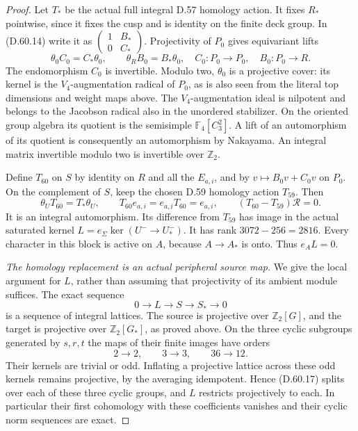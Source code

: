 \begin{proof}
Let \(T_*\) be the actual full
integral D.57 homology action.
It fixes \(R_*\) pointwise,
since it fixes the cusp and is
identity on the finite deck group.
In (D.60.14) write it as
\(\left(\begin{smallmatrix}1&B_*\\0&C_*\end{smallmatrix}\right)\).
Projectivity of \(P_0\) gives
equivariant lifts
\[
 \theta_0 C_0=C_*\theta_0,
 \qquad \theta_R B_0=B_*\theta_0,
 \quad C_0:P_0\to P_0,
 \quad B_0:P_0\to R.
 \tag{D.60.15}
\]
The endomorphism \(C_0\) is
invertible. Modulo two,
\(\theta_0\) is a projective
cover: its kernel is the
\(V_4\)-augmentation radical
of \(P_0\), as is also seen
from the literal top dimensions
and weight maps above. The
\(V_4\)-augmentation ideal
is nilpotent and belongs to
the Jacobson radical also in
the unordered stabilizer.
On the oriented group algebra
its quotient is the semisimple
\(\mathbb F_4[C_3^2]\).
A lift
of an automorphism of its
quotient is consequently an
automorphism by Nakayama.
An integral matrix invertible
modulo two is invertible over
\(\mathbb Z_2\).

Define \(T_{60}\) on \(S\)
by identity on \(R\) and
all the \(E_{a,i}\), and by
\(v\mapsto B_0v+C_0v\)
on \(P_0\). On the complement
of \(S\), keep the chosen
D.59 homology action \(T_{59}\).
Then
\[
 \theta_U T_{60}=T_*\theta_U,
 \qquad T_{60}e_{a,i}=e_{a,i}T_{60}=e_{a,i},
 \qquad
 (T_{60}-T_{59})\mathcal R=0.
 \tag{D.60.16}
\]
It is an integral automorphism.
Its difference from \(T_{59}\)
has image in the actual saturated
kernel \(L=e_\Sigma\ker(U^-\to U_*^-)\).
It has rank \(3072-256=2816\).
Every character in this block
is active on \(A\), because
\(A\to A_*\) is onto.
Thus \(e_A L=0\).

\emph{The homology replacement is an actual peripheral source map.}
We give the local argument for
\(L\), rather than assuming
that projectivity of its ambient
module suffices. The exact
sequence
\[
                 0\longrightarrow L\longrightarrow S
                   \longrightarrow S_*\longrightarrow0
 \tag{D.60.17}
\]
is a sequence of integral lattices.
The source is projective over
\(\mathbb Z_2[G]\), and the
target is projective over
\(\mathbb Z_2[G_*]\), as proved
above. On the three cyclic
subgroups generated by \(s,r,t\)
the maps of their finite images
have orders
\[
                  2\to2,\qquad3\to3,\qquad36\to12.
 \tag{D.60.18}
\]
Their kernels are trivial or odd.
Inflating a projective lattice
across these odd kernels remains
projective, by the averaging
idempotent. Hence (D.60.17)
splits over each of these three
cyclic groups, and \(L\)
restricts projectively to each.
In particular their first
cohomology with these coefficients
vanishes and their cyclic norm
sequences are exact.


\end{proof}
